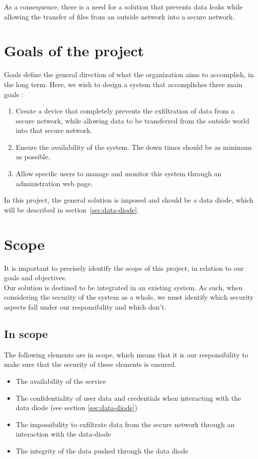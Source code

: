 \documentclass[a4paper,11pt]{article}
\begin{document}
As a consequence, there is a need for a solution that prevents data leaks while allowing the transfer of files from an outside network into a secure network.

\section{Goals of the project}
\label{sec:goals}
Goals define the general direction of what the organization aims to accomplish, in the long term. Here, we wish to design a system that accomplishes three main goals :

\begin{enumerate}
\item{Create a device that completely prevents the exfiltration of data from a secure network, while allowing data to be transferred from the outside world into that secure network.}
\item{Ensure the availability of the system. The down times should be as minimum as possible.}
\item{Allow specific users to manage and monitor this system through an administration web page.}
\end{enumerate}

In this project, the general solution is imposed and should be a data diode, which will be described in section~\ref{sec:data-diode}.

\section{Scope}
It is important to precisely identify the scope of this project, in relation to our goals and objectives.\\

Our solution is destined to be integrated in an existing system. As such, when considering the security of the system as a whole, we must identify which security aspects fall under our responsibility and which don't. 

\subsection{In scope}
The following elements are in scope, which means that it is our responsibility to make sure that the security of these elements is ensured.

\begin{itemize}
\item{The availability of the service}
\item{The confidentiality of user data and credentials when interacting with the data diode (see section \ref{sec:data-diode})}
\item{The impossibility to exfiltrate data from the secure network through an interaction with the data-diode}
\item{The integrity of the data pushed through the data diode}
\end{itemize}
\end{document}

